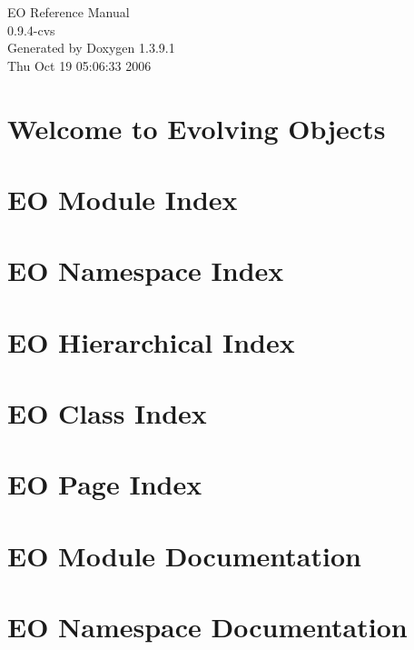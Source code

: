 \documentclass[a4paper]{book}
\begin{document}
\begin{titlepage}
\vspace*{7cm}
\begin{center}
{\Large EO Reference Manual\\[1ex]\large 0.9.4-cvs }\\
\vspace*{1cm}
{\large Generated by Doxygen 1.3.9.1}\\
\vspace*{0.5cm}
{\small Thu Oct 19 05:06:33 2006}\\
\end{center}
\end{titlepage}
\clearemptydoublepage
{}
\tableofcontents
\clearemptydoublepage
{}
\chapter{Welcome to Evolving Objects }
\label{index}
\chapter{EO Module Index}

\chapter{EO Namespace Index}

\chapter{EO Hierarchical Index}

\chapter{EO Class Index}

\chapter{EO Page Index}

\chapter{EO Module Documentation}







\chapter{EO Namespace Documentation}

\end{document}
